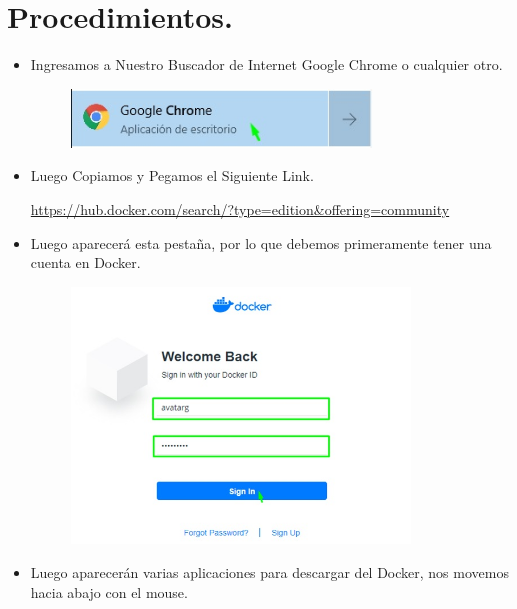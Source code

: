 \section{Procedimientos.}

	\begin{itemize}
		\subsection{Descarga del Software.}
			\item Ingresamos a Nuestro Buscador de Internet Google Chrome  o cualquier otro.
				\begin{figure}[htb]
					\begin{center}
						\includegraphics[width=8cm]{./Imagenes/BuscarAppGoogle}
					\end{center}
				\end{figure}
			\item Luego Copiamos y Pegamos el Siguiente Link.
				\begin{center}
					\url{https://hub.docker.com/search/?type=edition&offering=community}
				\end{center}
			\item Luego aparecerá esta pestaña, por lo que debemos primeramente tener una cuenta en Docker.
				\begin{figure}[htb]
					\begin{center}
						\includegraphics[width=9cm]{./Imagenes/Loguearse}
					\end{center}
				\end{figure}			
			\item Luego aparecerán varias aplicaciones para descargar del Docker, nos movemos hacia abajo con el mouse.

\end{itemize}
